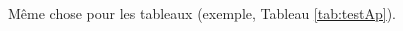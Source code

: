 \documentclass[letterpaper%
, twoside%
, 12pt%
, these%
, francais
, creativecommons, hyperref, withAlgo2e%
]{thETS}
\begin{document}
Même chose pour les tableaux (exemple, Tableau \ref{tab:testAp}).



\newpage %
\begin{spacing}{1}  
	\nocite{*} %
	
	
\end{spacing}
\end{document}
